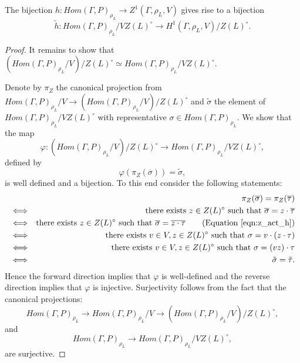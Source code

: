 \begin{lemma}
  The bijection $h: Hom(\Gamma, P)_{\rho_L} \rightarrow Z^1(\Gamma, \rho_L, V)$ gives rise to a bijection
  \begin{displaymath}
    \tilde{h}: Hom(\Gamma, P)_{\rho_L}/VZ(L)^\circ \rightarrow H^1(\Gamma, \rho_L, V)/Z(L)^\circ.
  \end{displaymath}
  \label{lem:vzl_h1zl}
\end{lemma}
\begin{proof}
  It remains to show that $\left(Hom(\Gamma, P)_{\rho_L}/V\right)/Z(L)^\circ \simeq Hom(\Gamma, P)_{\rho_L}/VZ(L)^\circ$.

  Denote by $\pi_Z$ the canonical projection from $Hom(\Gamma, P)_{\rho_L}/V \rightarrow \left( Hom(\Gamma, P)_{\rho_L}/V \right)/Z(L)^\circ$ and $\tilde{\sigma}$ the element of $Hom(\Gamma, P)_{\rho_L}/VZ(L)^\circ$ with representative $\sigma \in Hom(\Gamma, P)_{\rho_L}$. We show that the map
  \begin{displaymath}
    \varphi: (Hom(\Gamma, P)_{\rho_L}/V)/Z(L)^\circ \rightarrow Hom(\Gamma, P)_{\rho_L}/VZ(L)^\circ,
  \end{displaymath}
  defined by
  \begin{displaymath}
    \varphi(\pi_Z(\overline{\sigma})) = \tilde{\sigma},
  \end{displaymath}
  is well defined and a bijection. To this end consider the following statements:
  \begin{eqnarray*}
    && \pi_Z(\overline{\sigma}) = \pi_Z(\overline{\tau}) \\
    &\Longleftrightarrow& \textrm{there exists } z \in Z(L)^\circ \textrm{ such that } \overline{\sigma} = z \cdot \overline{\tau} \\
    &\Longleftrightarrow& \textrm{there exists } z \in Z(L)^\circ \textrm{ such that } \overline{\sigma} = \overline{z \cdot \tau} \qquad (\textrm{Equation } \ref{eqn:z_act_h}) \\
    &\Longleftrightarrow& \textrm{there exists } v \in V, z \in Z(L)^\circ \textrm{ such that } \sigma = v \cdot (z \cdot \tau) \\
    &\Longleftrightarrow& \textrm{there exists } v \in V, z \in Z(L)^\circ \textrm{ such that } \sigma = (vz) \cdot \tau \\
    &\Longleftrightarrow& \tilde{\sigma} = \tilde{\tau}.
  \end{eqnarray*}
  Hence the forward direction implies that $\varphi$ is well-defined and the reverse direction implies that $\varphi$ is injective. Surjectivity follows from the fact that the canonical projections:
  \begin{displaymath}
    Hom(\Gamma, P)_{\rho_L} \rightarrow Hom(\Gamma, P)_{\rho_L}/V \rightarrow (Hom(\Gamma, P)_{\rho_L}/V)/Z(L)^\circ, 
  \end{displaymath}
  and
  \begin{displaymath}
    Hom(\Gamma, P)_{\rho_L} \rightarrow Hom(\Gamma, P)_{\rho_L}/VZ(L)^\circ, 
  \end{displaymath}
  are surjective.
\end{proof}

